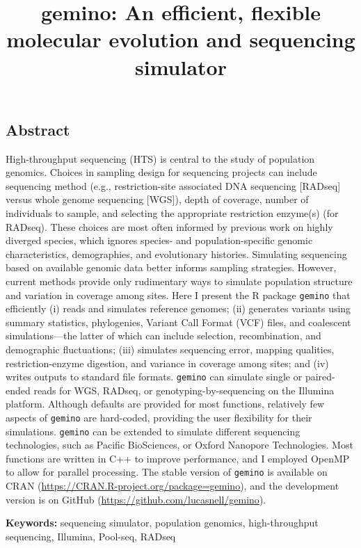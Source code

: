 \documentclass[12pt,]{article}
\title{gemino: An efficient, flexible molecular evolution and sequencing
simulator}
\author{}
\date{}
\begin{document}
\maketitle

\hypertarget{abstract}{%
\subsection{Abstract}\label{abstract}}

High-throughput sequencing (HTS) is central to the study of population
genomics. Choices in sampling design for sequencing projects can include
sequencing method (e.g., restriction-site associated DNA sequencing
{[}RADseq{]} versus whole genome sequencing {[}WGS{]}), depth of
coverage, number of individuals to sample, and selecting the appropriate
restriction enzyme(s) (for RADseq). These choices are most often
informed by previous work on highly diverged species, which ignores
species- and population-specific genomic characteristics, demographies,
and evolutionary histories. Simulating sequencing based on available
genomic data better informs sampling strategies. However, current
methods provide only rudimentary ways to simulate population structure
and variation in coverage among sites. Here I present the R package
\texttt{gemino} that efficiently (i) reads and simulates reference
genomes; (ii) generates variants using summary statistics, phylogenies,
Variant Call Format (VCF) files, and coalescent simulations---the latter
of which can include selection, recombination, and demographic
fluctuations; (iii) simulates sequencing error, mapping qualities,
restriction-enzyme digestion, and variance in coverage among sites; and
(iv) writes outputs to standard file formats. \texttt{gemino} can
simulate single or paired-ended reads for WGS, RADseq, or
genotyping-by-sequencing on the Illumina platform. Although defaults are
provided for most functions, relatively few aspects of \texttt{gemino}
are hard-coded, providing the user flexibility for their simulations.
\texttt{gemino} can be extended to simulate different sequencing
technologies, such as Pacific BioSciences, or Oxford Nanopore
Technologies. Most functions are written in C++ to improve performance,
and I employed OpenMP to allow for parallel processing. The stable
version of \texttt{gemino} is available on CRAN
(\url{https://CRAN.R-project.org/package=gemino}), and the development
version is on GitHub (\url{https://github.com/lucasnell/gemino}).

\textbf{Keywords:} sequencing simulator, population genomics,
high-throughput sequencing, Illumina, Pool-seq, RADseq
\end{document}
